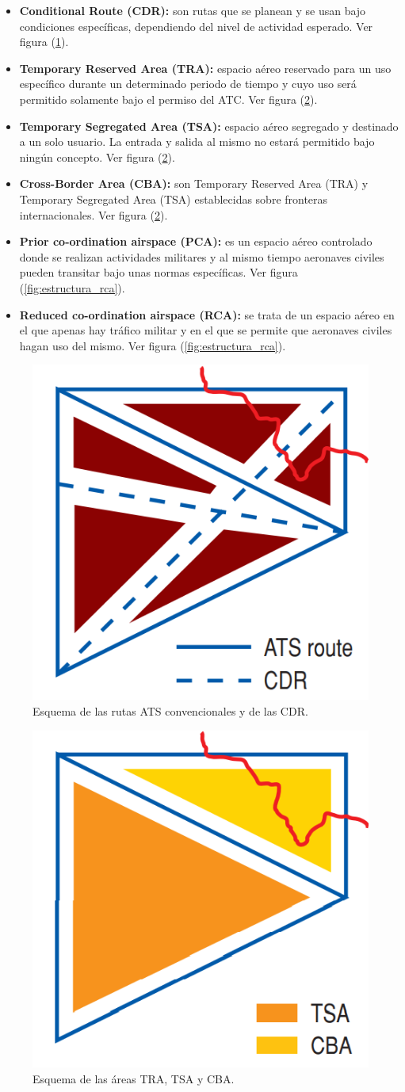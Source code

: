 \begin{itemize}
    \item \textbf{Conditional Route (CDR):} son rutas que se planean y se usan bajo condiciones específicas, dependiendo del nivel de actividad esperado. Ver figura (\ref{fig:estructura_cdr}).
    \item \textbf{Temporary Reserved Area (TRA):} espacio aéreo reservado para un uso específico durante un determinado periodo de tiempo y cuyo uso será permitido solamente bajo el permiso del ATC. Ver figura (\ref{fig:estrutura_tsa_cba}).
    \item \textbf{Temporary Segregated Area (TSA):} espacio aéreo segregado y destinado a un solo usuario. La entrada y salida al mismo no estará permitido bajo ningún concepto. Ver figura (\ref{fig:estrutura_tsa_cba}).
    \item \textbf{Cross-Border Area (CBA):} son Temporary Reserved Area (TRA) y Temporary Segregated Area (TSA) establecidas sobre fronteras internacionales. Ver figura (\ref{fig:estrutura_tsa_cba}).
    \item \textbf{Prior co-ordination airspace (PCA):} es un espacio aéreo controlado donde se realizan actividades militares y al mismo tiempo aeronaves civiles pueden transitar bajo unas normas específicas. Ver figura (\ref{fig:estructura_rca}).
    \item \textbf{Reduced co-ordination airspace (RCA):} se trata de un espacio aéreo en el que apenas hay tráfico militar y en el que se permite que aeronaves civiles hagan uso del mismo. Ver figura (\ref{fig:estructura_rca}).
\end{itemize}

\begin{figure}[H]
    \centering
    \includegraphics[width=0.25\linewidth]{figuras/estructura_cdr.png}
    \caption{Esquema de las rutas ATS convencionales y de las CDR.}
    \label{fig:estructura_cdr}
\end{figure}

\begin{figure}[H]
    \centering
    \includegraphics[width=0.25\linewidth]{figuras/estrutura_tsa_cba.png}
    \caption{Esquema de las áreas TRA, TSA y CBA.}
    \label{fig:estrutura_tsa_cba}
\end{figure}

